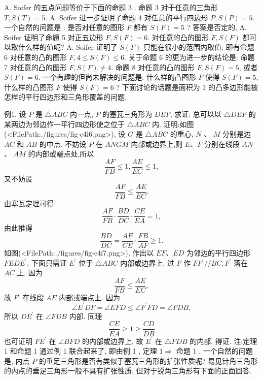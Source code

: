 A. Soifer 的五点问题等价于下面的命题 3 .
命题 3 对于任意的三角形 $T, S(T)=5$.
A. Soifer 进一步证明了命题 4 对任意的平行四边形 $P, S(P)=5$.
一个自然的问题是 : 是否对任意的图形 $F$ 都有 $S(F)=5$ ?
答案是否定的, A. Soifer 证明了命题 5 对正五边形 $F, S(F)=6$.
対任意的凸的图形 $F, S(F)$ 都可以取什么样的值呢? A. Soifer 证明了 $S(F)$ 只能在很小的范围内取值, 即有命题 6 对任意的凸的图形 $F, 4 \leqslant S(F) \leqslant 6$.
关于命题 6 的更为进一步的结论是:
命题 7 对任意的凸的图形 $F, S(F) \neq 4$.
命题 8 对任意的凸的图形 $F, S(F)=5$, 或者 $S(F)=6$.
一个有趣的但尚未解决的问题是: 什么样的凸图形 $F$ 使得 $S(F)=5$, 什么样的凸图形 $F$ 使得 $S(F)=6$ ?
下面讨论的话题是面积为 1 的凸多边形能被怎样的平行四边形和三角形覆盖的问题.



例1. 设 $P$ 是 $\triangle A B C$ 内一点, $P$ 的塞瓦三角形为 $D E F$, 求证: 总可以以 $\triangle D E F$ 的某两边为邻边作一平行四边形使之位于 $\triangle A B C$ 内.
证明:如图(<FilePath:./figures/fig-c4i6.png>), 设 $G$ 是 $\triangle A B C$ 的重心, $N$ 、 $M$ 分别是边 $A C$ 和 $A B$ 的中点.
不妨设 $P$ 在 $A N G M$ 内部或边界上,则 $E 、 F$ 分别在线段 $A N$ 、 $A M$ 的内部或端点处,所以
$$
\frac{A F}{F B} \leqslant 1, \frac{A E}{E C} \leqslant 1,
$$
又不妨设
$$
\frac{A F}{F B} \leqslant \frac{A E}{E C} .
$$
由塞瓦定理可得
$$
\frac{A F}{F B} \cdot \frac{B D}{D C} \cdot \frac{C E}{E A}=1,
$$
由此推得
$$
\frac{B D}{D C}=\frac{A E}{C E} \cdot \frac{F B}{A F} \geqslant 1 .
$$
如图(<FilePath:./figures/fig-c4i7.png>), 作出以 $E F 、 E D$ 为邻边的平行四边形 $F E D E^{\prime}$, 下面只需证 $E^{\prime}$ 位于 $\triangle A B C$ 内部或边界上.
过 $F$ 作 $F F^{\prime} / / B C, F^{\prime}$ 落在 $A C$ 上, 因为
$$
\frac{A F}{F B} \leqslant \frac{A E}{E C},
$$
故 $F^{\prime}$ 在线段 $A E$ 内部或端点上.
因为
$$
\angle E^{\prime} D F=\angle E F D \leqslant \angle F^{\prime} F D=\angle F D B,
$$
所以 $D E^{\prime}$ 在 $\angle F D B$ 内部.
同理
$$
\frac{C E}{E A} \geqslant 1 \geqslant \frac{C D}{D B}
$$
也可证明 $F E^{\prime}$ 在 $\angle B F D$ 的内部或边界上, 故 $E^{\prime}$ 在 $\triangle F D B$ 的内部.
得证.
注:定理 1 和命题 1 通过例 1 联合起来了, 即由例 1 ,
定理 $1 \Rightarrow$ 命题 1 .
一个自然的问题是, 内点 $P$ 的垂足三角形是否有类似于塞瓦三角形的扩张性质呢?
易见针角三角形的内点的垂足三角形一般不具有扩张性质, 但对于锐角三角形有下面的正面回答.



